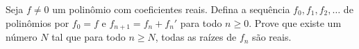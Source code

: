 Seja \( f \ne 0\) um polinômio com coeficientes reais. Defina a sequência \( f_{0}, f_{1}, f_{2}, \ldots\) de polinômios por \( f_{0}= f\) e \( f_{n+1}= f_{n}+f_{n}'\) para todo \( n \ge 0\). Prove que existe um número \( N\) tal que para todo \( n \ge N\), todas as raízes de \( f_{n}\) são reais.
